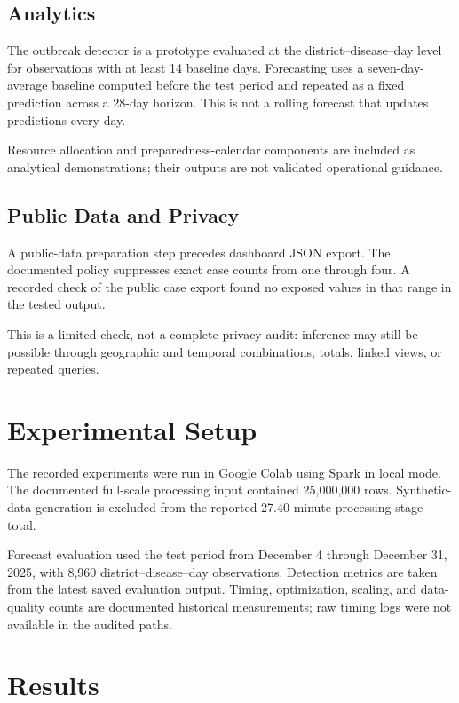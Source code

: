 \documentclass[conference]{IEEEtran}
\begin{document}
\subsection{Analytics}

The outbreak detector is a prototype evaluated at the district--disease--day level for observations with at least 14 baseline days. Forecasting uses a seven-day-average baseline computed before the test period and repeated as a fixed prediction across a 28-day horizon. This is not a rolling forecast that updates predictions every day.

Resource allocation and preparedness-calendar components are included as analytical demonstrations; their outputs are not validated operational guidance.

\subsection{Public Data and Privacy}

A public-data preparation step precedes dashboard JSON export. The documented policy suppresses exact case counts from one through four. A recorded check of the public case export found no exposed values in that range in the tested output.

This is a limited check, not a complete privacy audit: inference may still be possible through geographic and temporal combinations, totals, linked views, or repeated queries.

\section{Experimental Setup}

The recorded experiments were run in Google Colab using Spark in local mode. The documented full-scale processing input contained 25,000,000 rows. Synthetic-data generation is excluded from the reported 27.40-minute processing-stage total.

Forecast evaluation used the test period from December 4 through December 31, 2025, with 8,960 district--disease--day observations. Detection metrics are taken from the latest saved evaluation output. Timing, optimization, scaling, and data-quality counts are documented historical measurements; raw timing logs were not available in the audited paths.

\section{Results}
\end{document}
